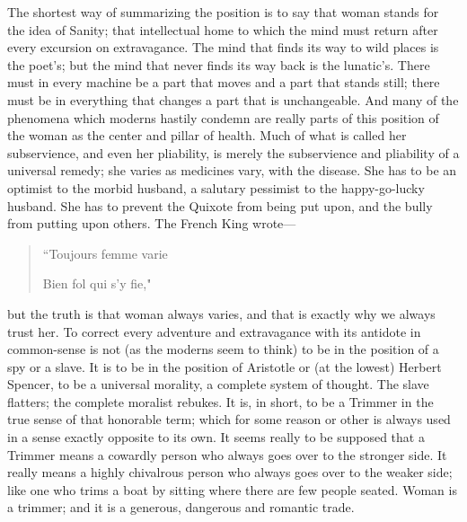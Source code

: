 \documentclass{book}
\begin{document}
The shortest way of summarizing the position is to say that woman stands for the idea of Sanity; that intellectual home to which the mind must return after every excursion on extravagance. The mind that finds its way to wild places is the poet’s; but the mind that never finds its way back is the lunatic’s. There must in every machine be a part that moves and a part that stands still; there must be in everything that changes a part that is unchangeable. And many of the phenomena which moderns hastily condemn are really parts of this position of the woman as the center and pillar of health. Much of what is called her subservience, and even her pliability, is merely the subservience and pliability of a universal remedy; she varies as medicines vary, with the disease. She has to be an optimist to the morbid husband, a salutary pessimist to the happy-go-lucky husband. She has to prevent the Quixote from being put upon, and the bully from putting upon others. The French King wrote—

\begin{quotation}
	“Toujours femme varie

	Bien fol qui s’y fie,"
\end{quotation}

but the truth is that woman always varies, and that is exactly why we always trust her. To correct every adventure and extravagance with its antidote in common-sense is not (as the moderns seem to think) to be in the position of a spy or a slave. It is to be in the position of Aristotle or (at the lowest) Herbert Spencer, to be a universal morality, a complete system of thought. The slave flatters; the complete moralist rebukes. It is, in short, to be a Trimmer in the true sense of that honorable term; which for some reason or other is always used in a sense exactly opposite to its own. It seems really to be supposed that a Trimmer means a cowardly person who always goes over to the stronger side. It really means a highly chivalrous person who always goes over to the weaker side; like one who trims a boat by sitting where there are few people seated. Woman is a trimmer; and it is a generous, dangerous and romantic trade.
\end{document}
